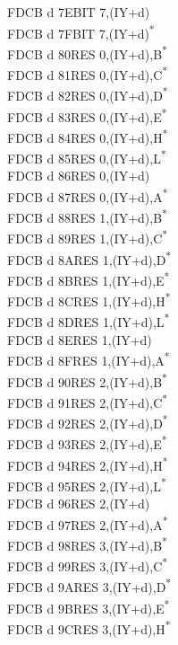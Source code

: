 \documentclass[oneside,a4paper]{book}
\begin{document}
\begin{multicols}{3}
{\begin{tabbing}
FDCB d 7E\>BIT 7,(IY+d)\\
FDCB d 7F\>BIT 7,(IY+d)\textsuperscript{*}\\
FDCB d 80\>RES 0,(IY+d),B\textsuperscript{*}\\
FDCB d 81\>RES 0,(IY+d),C\textsuperscript{*}\\
FDCB d 82\>RES 0,(IY+d),D\textsuperscript{*}\\
FDCB d 83\>RES 0,(IY+d),E\textsuperscript{*}\\
FDCB d 84\>RES 0,(IY+d),H\textsuperscript{*}\\
FDCB d 85\>RES 0,(IY+d),L\textsuperscript{*}\\
FDCB d 86\>RES 0,(IY+d)\\
FDCB d 87\>RES 0,(IY+d),A\textsuperscript{*}\\
FDCB d 88\>RES 1,(IY+d),B\textsuperscript{*}\\
FDCB d 89\>RES 1,(IY+d),C\textsuperscript{*}\\
FDCB d 8A\>RES 1,(IY+d),D\textsuperscript{*}\\
FDCB d 8B\>RES 1,(IY+d),E\textsuperscript{*}\\
FDCB d 8C\>RES 1,(IY+d),H\textsuperscript{*}\\
FDCB d 8D\>RES 1,(IY+d),L\textsuperscript{*}\\
FDCB d 8E\>RES 1,(IY+d)\\
FDCB d 8F\>RES 1,(IY+d),A\textsuperscript{*}\\
FDCB d 90\>RES 2,(IY+d),B\textsuperscript{*}\\
FDCB d 91\>RES 2,(IY+d),C\textsuperscript{*}\\
FDCB d 92\>RES 2,(IY+d),D\textsuperscript{*}\\
FDCB d 93\>RES 2,(IY+d),E\textsuperscript{*}\\
FDCB d 94\>RES 2,(IY+d),H\textsuperscript{*}\\
FDCB d 95\>RES 2,(IY+d),L\textsuperscript{*}\\
FDCB d 96\>RES 2,(IY+d)\\
FDCB d 97\>RES 2,(IY+d),A\textsuperscript{*}\\
FDCB d 98\>RES 3,(IY+d),B\textsuperscript{*}\\
FDCB d 99\>RES 3,(IY+d),C\textsuperscript{*}\\
FDCB d 9A\>RES 3,(IY+d),D\textsuperscript{*}\\
FDCB d 9B\>RES 3,(IY+d),E\textsuperscript{*}\\
FDCB d 9C\>RES 3,(IY+d),H\textsuperscript{*}\\

\end{tabbing}}
\end{multicols}
\end{document}
